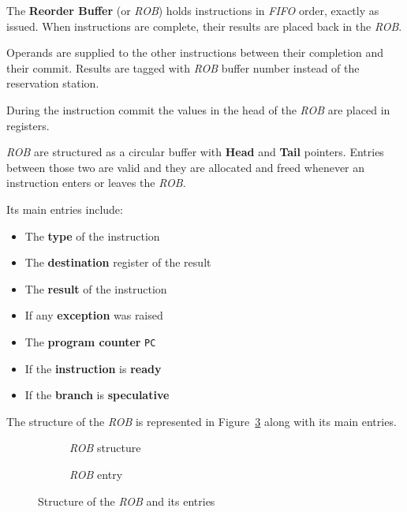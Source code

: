 \documentclass[english]{article}
\begin{document}
The \textbf{Reorder Buffer} (or \textit{ROB}) holds instructions in \textit{FIFO} order, exactly as issued.
When instructions are complete, their results are placed back in the \textit{ROB}.

Operands are supplied to the other instructions between their completion and their commit.
Results are tagged with \textit{ROB} buffer number instead of the reservation station.

During the instruction commit the values in the head of the \textit{ROB} are placed in registers.

\bigskip
\textit{ROB} are structured as a circular buffer with \textbf{Head} and \textbf{Tail} pointers.
Entries between those two are valid and they are allocated and freed whenever an instruction enters or leaves the \textit{ROB}.

Its main entries include:

\begin{itemize}
  \item The \textbf{type} of the instruction
  \item The \textbf{destination} register of the result
  \item The \textbf{result} of the instruction
  \item If any \textbf{exception} was raised
  \item The \textbf{program counter} \texttt{PC}
  \item If the \textbf{instruction} is \textbf{ready}
  \item If the \textbf{branch} is \textbf{speculative}
\end{itemize}

\bigskip
The structure of the \textit{ROB} is represented in Figure~\ref{fig:structure-of-ROB} along with its main entries.

\begin{figure}[htpb]
  \bigskip
  \centering
  \begin{subfigure}[]{\textwidth}
    \centering
    \caption{\textit{ROB} structure}
    \label{subfig:structure-rob}
  \end{subfigure}
  \par\bigskip
  \begin{subfigure}[]{\textwidth}
    \centering
    \caption{\textit{ROB} entry}
    \label{subfig:rob-entries}
  \end{subfigure}
  \caption{Structure of the \textit{ROB} and its entries}
  \label{fig:structure-of-ROB}
  \bigskip
\end{figure}
\end{document}
